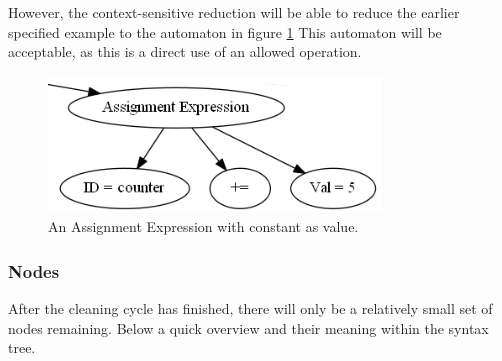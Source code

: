 \documentclass[12pt]{article}
\begin{document}
However, the context-sensitive reduction will be able to reduce the earlier specified example to the automaton in figure \ref{fig:folded_addition} This automaton will be acceptable, as this is a direct use of an allowed operation.

\begin{figure}[h]
	\centering
	\includegraphics[width=0.6\linewidth]{folded_addition}
	\caption{An Assignment Expression with constant as value.}
	\label{fig:folded_addition}
\end{figure}
\newpage
\subsubsection{Nodes}
After the cleaning cycle has finished, there will only be a relatively small set of nodes remaining. Below a quick overview and their meaning within the syntax tree.
\end{document}
